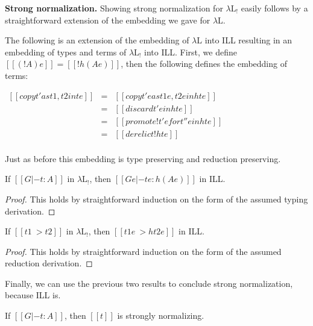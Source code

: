 \documentclass{entcs}
\begin{document}
\textbf{Strong normalization.} Showing strong normalization for
$\lambda\text{L}_!$ easily follows by a straightforward extension of
the embedding we gave for $\lambda\text{L}$.
\begin{definition}
  \label{def:embed-lambda-L!-in-ILL}
  The following is an extension of the embedding of $\lambda\text{L}$
  into ILL resulting in an embedding of types and terms of
  $\lambda\text{L}_!$ into ILL. First, we define $[[(! A) e]] = [[!
      h(A e)]]$, then the following defines the embedding of terms:
  \begin{center} \small
    \begin{math}
      \begin{array}{rlllllllllllllllllll}        
        [[{copy t' as t1 , t2 in t} e]] & = & [[copy t' e as t1 e , t2 e in h{t e}]]\\
        [[{discard t' in t} e]] & = & [[discard t' e in h{t e}]]\\
        [[{promote! t' for t'' in t} e]] & = & [[promote! t' e for t'' e in h{t e}]]\\
        [[{derelict! t} e]] & = & [[derelict! h{t e}]]\\
      \end{array}
    \end{math}
  \end{center}
\end{definition}

\noindent
Just as before this embedding is type preserving and reduction preserving.
\begin{lem}
  \label{lemma:type_preserving_embedding_lambdaL!}
  If $[[G |- t : A]]$ in $\lambda\text{L}_!$, then
  $[[G e |- t e : h(A e)]]$ in ILL.
\end{lem}
\begin{proof}
  This holds by straightforward induction on the form of the assumed
  typing derivation.
\end{proof}

\begin{lem}
  \label{lemma:reduction_preserving_embedding_lambdaL!}
  If $[[t1 ~> t2]]$ in $\lambda\text{L}_!$, then $[[t1 e ~> h{t2 e}]]$
  in ILL.
\end{lem}
\begin{proof}
  This holds by straightforward induction on the form of the assumed
  reduction derivation.
\end{proof}
\noindent
Finally, we can use the previous two results to conclude strong
normalization, because ILL is.
\begin{thm}
  \label{corollary:strong_normalization_lambdaL!}
  If $[[G |- t : A]]$, then $[[t]]$ is strongly normalizing.
\end{thm}
\end{document}

